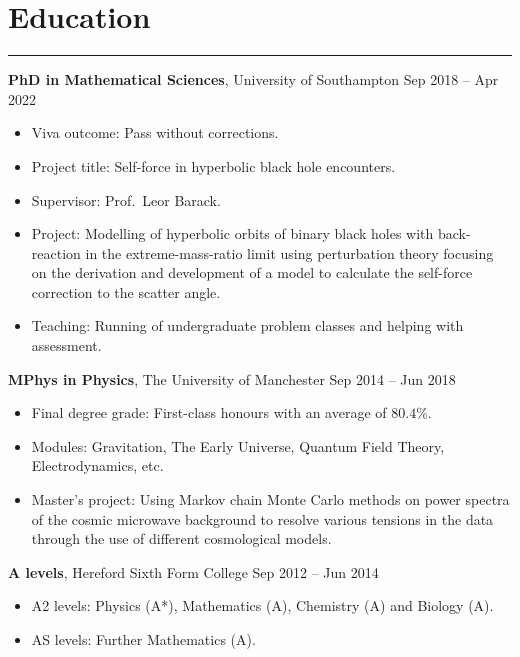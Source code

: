 \documentclass[10.5pt, oneside]{article}   	%
\begin{document}
{\color{Sectioncolour}
\section*{Education}
\vspace{-3mm}
\noindent\rule{\linewidth}{0.6pt}}

\textbf{PhD in Mathematical Sciences}, University of Southampton \hfill Sep 2018 -- Apr 2022 \\
\vspace{-5mm}
\begin{itemize}
\item Viva outcome: Pass without corrections.
\item Project title: Self-force in hyperbolic black hole encounters.
\item Supervisor: Prof.\ Leor Barack.
\item Project: Modelling of hyperbolic orbits of binary black holes with back-reaction in the extreme-mass-ratio limit using perturbation theory focusing on the derivation and development of a model to calculate the self-force correction to the scatter angle.
\item Teaching: Running of undergraduate problem classes and helping with assessment.
\end{itemize}

\textbf{MPhys in Physics}, The University of Manchester \hfill Sep 2014 -- Jun 2018 \\
\vspace{-5mm}
\begin{itemize}
\item Final degree grade: First-class honours with an average of $80.4\%$.
\item Modules: Gravitation, The Early Universe, Quantum Field Theory,  Electrodynamics, etc.
\item Master's project: Using Markov chain Monte Carlo methods on power spectra of the cosmic microwave background to resolve various tensions in the data through the use of different cosmological models.
\end{itemize} 

\textbf{A levels}, Hereford Sixth Form College \hfill Sep 2012 -- Jun 2014 \\
\vspace{-5mm}
\begin{itemize}
\item A2 levels: Physics (A*), Mathematics (A), Chemistry (A) and Biology (A).
\item AS levels: Further Mathematics (A).
\end{itemize} 
\end{document}
